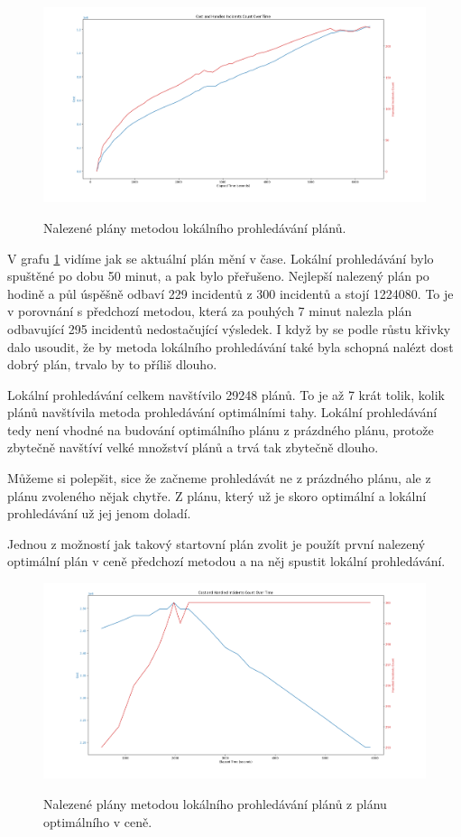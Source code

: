 \begin{figure}[H]
  \caption{Nalezené plány metodou lokálního prohledávání plánů.}
  \includegraphics[width=\textwidth]{img/plots/localSearch_empty.png}
  \centering
  \label{img:localSearchRes}
\end{figure}

V grafu \ref{img:localSearchRes} vidíme jak se aktuální plán mění v čase.
Lokální prohledávání bylo spuštěné po dobu 50 minut, a pak bylo přeřušeno. 
Nejlepší nalezený plán po hodině a půl úspěšně odbaví 229 incidentů z 300 incidentů a stojí 1224080.
To je v porovnání s předchozí metodou, která za pouhých 7 minut nalezla plán odbavující 295 incidentů nedostačující výsledek.
I když by se podle růstu křivky dalo usoudit, že by metoda lokálního prohledávání také byla schopná nalézt dost dobrý plán, trvalo by to příliš dlouho.

Lokální prohledávání celkem navštívilo 29248 plánů. To je až 7 krát tolik, kolik plánů navštívila metoda prohledávání optimálními tahy.
Lokální prohledávání tedy není vhodné na budování optimálního plánu z prázdného plánu, protože zbytečně navštíví velké množství plánů a trvá tak zbytečně dlouho.

Můžeme si polepšit, sice že začneme prohledávát ne z prázdného plánu, ale z plánu zvoleného nějak chytře. Z plánu, který už je skoro optimální a lokální prohledávání
už jej jenom doladí.

Jednou z možností jak takový startovní plán zvolit je použít první nalezený optimální plán v ceně předchozí metodou a na něj spustit lokální prohledávání.

\begin{figure}[H]
  \caption{Nalezené plány metodou lokálního prohledávání plánů z plánu optimálního v ceně.}
  \includegraphics[width=\textwidth]{img/plots/localSearch_fromOptimal.png}
  \centering
  \label{img:hybrid}
\end{figure}

